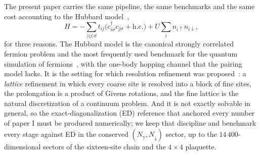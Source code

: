 \documentclass[a4paper,11pt,noarxiv]{quantumarticle}
\begin{document}
The present paper carries the same pipeline, the same benchmarks and the
same cost accounting to the Hubbard model~\cite{Hubbard1963,Arovas2022},
\begin{equation}
  H=-\sum_{\langle ij\rangle\sigma}t_{ij}\big(c^\dagger_{i\sigma}c_{j\sigma}+\mathrm{h.c.}\big)
   +U\sum_i n_{i\uparrow}n_{i\downarrow},
  \label{eq:hubbard}
\end{equation}
for three reasons.  The Hubbard model is the canonical strongly correlated
fermion problem and the most frequently used benchmark for the quantum
simulation of fermions~\cite{Wecker2015,Cade2020,Cai2020,Stanisic2022}, with
the one-body hopping channel that the pairing model lacks.  It is the setting
for which resolution refinement was proposed~\cite{Bogner2026}: a
\emph{lattice} refinement in which every coarse site is resolved into a block
of fine sites, the prolongation is a product of Givens rotations, and the fine
lattice is the natural discretization of a continuum problem.  And it is not
exactly solvable in general, so the exact-diagonalization (ED) reference that
anchored every number of paper I must be produced numerically; we keep that
discipline and benchmark every stage against ED in the conserved
$(N_\uparrow,N_\downarrow)$ sector, up to the $14\,400$-dimensional sectors of
the sixteen-site chain and the $4\times4$ plaquette.
\end{document}
